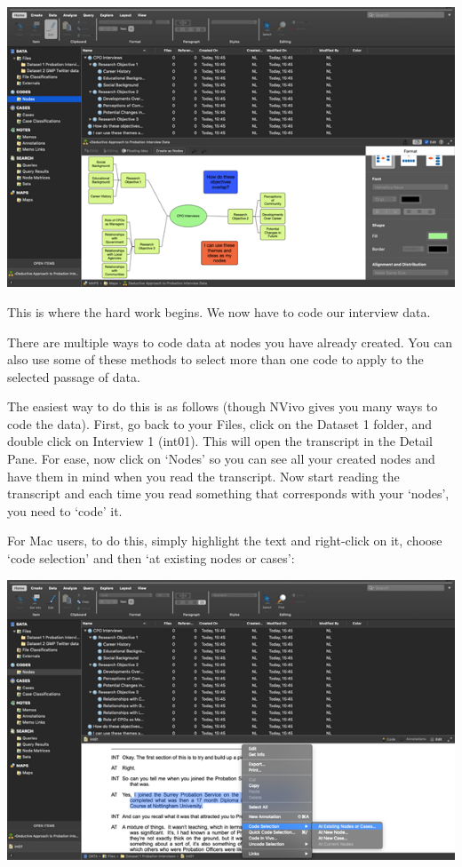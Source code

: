 \documentclass[
]{book}
\begin{document}
\includegraphics{imgs/nodes.png}

This is where the hard work begins. We now have to code our interview data.

There are multiple ways to code data at nodes you have already created. You can also use some of these methods to select more than one code to apply to the selected passage of data.

The easiest way to do this is as follows (though NVivo gives you many ways to code the data). First, go back to your Files, click on the Dataset 1 folder, and double click on Interview 1 (int01). This will open the transcript in the Detail Pane. For ease, now click on `Nodes' so you can see all your created nodes and have them in mind when you read the transcript. Now start reading the transcript and each time you read something that corresponds with your `nodes', you need to `code' it.

For Mac users, to do this, simply highlight the text and right-click on it, choose `code selection' and then `at existing nodes or cases':

\includegraphics{imgs/code_selection.png}
\end{document}
